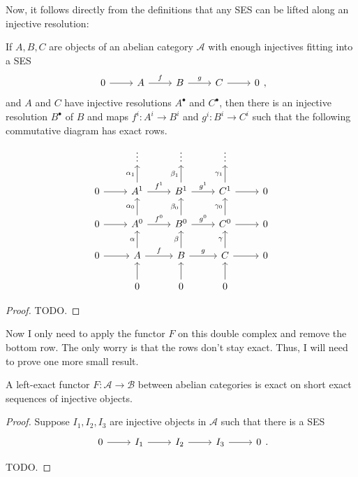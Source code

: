 Now, it follows directly from the definitions that any SES can
be lifted along an injective resolution:
\begin{prop}
  If $A, B, C$ are objects of an abelian category $\mathcal{A}$ with enough
  injectives fitting into a SES
  \[\begin{tikzcd}
      0\rar & A\rar{f} & B\rar{g} & C\rar & 0
    \end{tikzcd},\]
  and $A$ and $C$ have injective resolutions $A^{\bullet}$ and $C^{\bullet}$,
  then there is an injective resolution $B^{\bullet}$ of $B$ and maps
  $f^{i}:A^{i}\to B^{i}$ and $g^{i}:B^{i}\to C^{i}$ such that the following
  commutative diagram has exact rows.
\[\begin{tikzcd}
    & \vdots & \vdots & \vdots & \\
    0\rar & A^{1}\rar{f^{1}}\uar{\alpha_{1}} & B^{1}\rar{g^{1}}\uar{\beta_{1}}
    & C^{1}\rar\uar{\gamma_{1}} & 0 \\
    0\rar & A^{0}\rar{f^{0}}\uar{\alpha_{0}} & B^{0}\rar{g^{0}}\uar{\beta_{0}}
    & C^{0}\rar\uar{\gamma_{0}} & 0 \\
    0\rar& A\rar{f}\uar{\alpha} & B\rar{g}\uar{\beta} & C\rar\uar{\gamma}&0\\
    & 0\uar & 0\uar & 0\uar &
  \end{tikzcd}\]
\end{prop}
\begin{proof}
  TODO.
\end{proof}
Now I only need to apply the functor $F$ on this double complex
and remove the bottom row. The only worry is that the rows don't stay
exact. Thus, I will need to prove one more small result.
\begin{prop}
  A left-exact functor $F:\mathcal{A}\to\mathcal{B}$ between
  abelian categories is exact on short exact sequences of injective objects.
\end{prop}
\begin{proof}
  Suppose $I_{1}, I_{2}, I_{3}$ are injective objects in $\mathcal{A}$
  such that there is a SES
  \[\begin{tikzcd}
      0\rar & I_{1}\rar & I_{2}\rar & I_{3}\rar & 0
    \end{tikzcd}.\]

  TODO.
\end{proof}

